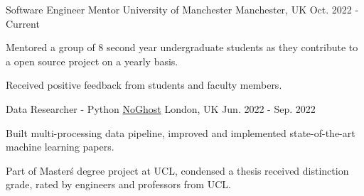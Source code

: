 \begin{cventries}
    \cventry
        {Software Engineer Mentor} %
        {University of Manchester} %
        {Manchester, UK} %
        {Oct. 2022 - Current} %
        {
        \begin{cvitems} %
            \item {Mentored a group of 8 second year undergraduate students as they contribute to a open source project on a yearly basis.}
            \item {Received positive feedback from students and faculty members.}
        \end{cvitems}
        }

    \cventry
        {Data Researcher - Python} %
        {\href{https://www.noghost.co.uk/}{NoGhost}} %
        {London, UK} %
        {Jun. 2022 - Sep. 2022} %
        {
        \begin{cvitems} %
            \item {Built multi-processing data pipeline, improved and implemented state-of-the-art machine learning papers.}
            \item {Part of Master\'s degree project at UCL, condensed a thesis received distinction grade, rated by engineers and professors from UCL.}
        \end{cvitems}
        }


\end{cventries}